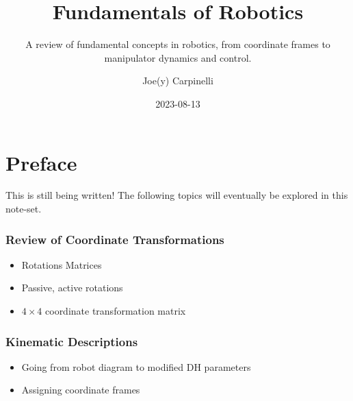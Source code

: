\documentclass[
  letterpaper,
  DIV=11,
  numbers=noendperiod]{scrreprt}
\title{Fundamentals of Robotics}
\subtitle{A review of fundamental concepts in robotics, from coordinate
frames to manipulator dynamics and control.}
\author{Joe(y) Carpinelli}
\date{2023-08-13}
\providecommand{\tightlist}{%
  \setlength{\itemsep}{0pt}\setlength{\parskip}{0pt}}\usepackage{longtable,booktabs,array}
\renewcommand*\contentsname{Table of contents}
\newcommand\contentsname{Table of contents}
\begin{document}
\maketitle
\ifdefined\Shaded\renewenvironment{Shaded}{\begin{tcolorbox}[enhanced, interior hidden, frame hidden, borderline west={3pt}{0pt}{shadecolor}, boxrule=0pt, sharp corners, breakable]}{\end{tcolorbox}}\fi

\renewcommand*\contentsname{Table of contents}
{
\hypersetup{linkcolor=}
\setcounter{tocdepth}{2}
\tableofcontents
}

\hypertarget{preface}{%
\chapter*{Preface}\label{preface}}


This is still being written! The following topics will eventually be
explored in this note-set.

\hypertarget{review-of-coordinate-transformations}{%
\subsection*{Review of Coordinate
Transformations}\label{review-of-coordinate-transformations}}

\begin{itemize}
\tightlist
\item
  Rotations Matrices
\item
  Passive, active rotations
\item
  \(4\times4\) coordinate transformation matrix
\end{itemize}

\hypertarget{kinematic-descriptions}{%
\subsection*{Kinematic Descriptions}\label{kinematic-descriptions}}

\begin{itemize}
\tightlist
\item
  Going from robot diagram to modified DH parameters
\item
  Assigning coordinate frames
\end{itemize}
\end{document}
